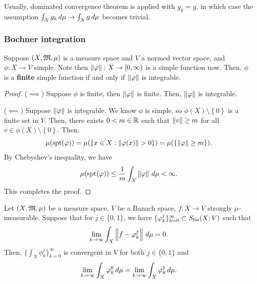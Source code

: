\documentclass[a4paper]{article}
\renewcommand{\seqinfk}[1]{\{ #1 \}_{k=0}^\infty}
\begin{document}
\begin{remark}
  Usually, dominated convergence theorem is applied with $g_k = g$, in
  which case the assumption $\int_X g_k \, d \mu \to \int_X g \, d \mu$
  becomes trivial.
\end{remark}

\subsubsection{Bochner integration}
\begin{lemma}
  Suppose $(X, \mathfrak{M}, \mu)$ is a measure space and $V$ a normed vector
  space, and $\phi: X \to V$ simple. Note then $\left\lVert \varphi\right\rVert : X \to [0,
    \infty)$ is a simple function now. Then, $\phi$ is a \textbf{finite}
  simple function if and only if $\left\lVert \varphi\right\rVert$ is integrable.
\end{lemma}

\begin{proof}
  ($\implies$) Suppose $\phi$ is finite, then
  $\left\lVert \varphi\right\rVert$ is finite. Then, $\left\lVert \varphi\right\rVert$ is integrable.

  ($\impliedby$) Suppose $\left\lVert \varphi\right\rVert$ is integrable. We know
  $\phi$ is simple, so $\phi(X) \setminus \left\{ 0 \right\}$
  is a finite set in $V$. Then, there exists $0 < m \in \mathbb{R}$ such
  that $\left\lVert v\right\rVert \geq m$ for all $v \in \phi(X) \setminus \left\{
    0 \right\}$. Then,
  \[
    \mu(\operatorname{spt}(\varphi)) = \mu(\{x \in X : \left\lVert \varphi(x)\right\rVert > 0\})
    = \mu(\{\left\lVert \varphi\right\rVert \geq m\}).
  \]
  By Chebyshev's inequality, we have
  \[
    \mu(\operatorname{spt}(\varphi)) \leq \frac{1}{m} \int_X \left\lVert \varphi\right\rVert \, d \mu < \infty.
  \]
  This completes the proof.
\end{proof}

\begin{lemma}
  Let $(X, \mathfrak{M}, \mu)$ be a measure space, $V$ be a Banach space, $f: X \to
    V$ strongly $\mu$-measurable. Suppose that for $j \in \{0, 1\}$, we have
  $\seqinfk{\phi_k^j} \subset \Sfin(X; V)$ such that
  \[
    \lim_{k \to \infty} \int_X \left\lVert f - \varphi_k^j\right\rVert \, d \mu = 0.
  \]
  Then, $\seqinfk{\int_X \phi_k^j}$ is convergent in $V$ for both $j \in
  \{0, 1\}$ and
  \[
    \lim_{k \to \infty} \int_X \varphi_k^0 \, d \mu =
    \lim_{k \to \infty} \int_X \varphi_k^1 \, d \mu.
  \]
\end{lemma}
\end{document}
